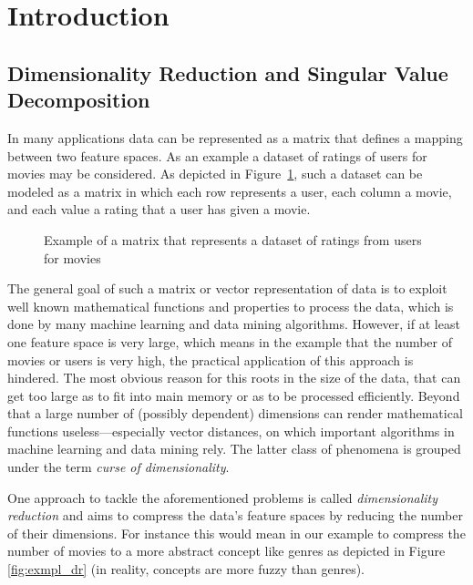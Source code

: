 \section{Introduction}

\subsection{Dimensionality Reduction and Singular Value Decomposition}

In many applications data can be represented as a matrix that defines a mapping between two feature spaces. As an example a dataset of ratings of users for movies may be considered. As depicted in Figure~\ref{fig:exmpl_matrix}, such a dataset can be modeled as a matrix in which each row represents a user, each column a movie, and each value a rating that a user has given a movie. 

\begin{figure}[h]
\centering
{}
\caption{Example of a matrix that represents a dataset of ratings from users for movies}
\label{fig:exmpl_matrix}
\end{figure}

The general goal of such a matrix or vector representation of data is to exploit well known mathematical functions and properties to process the data, which is done by many machine learning and data mining algorithms. However, if at least one feature space is very large, which means in the example that the number of movies or users is very high, the practical application of this approach is hindered. The most obvious reason for this roots in the size of the data, that can get too large as to fit into main memory or as to be processed efficiently. Beyond that a large number of (possibly dependent) dimensions can render mathematical functions useless---especially vector distances, on which important algorithms in machine learning and data mining rely. The latter class of phenomena is grouped under the term \textsl{curse of dimensionality}.

One approach to tackle the aforementioned problems is called \textsl{dimensionality reduction} and aims to compress the data's feature spaces by reducing the number of their dimensions. For instance this would mean in our example to compress the number of movies to a more abstract concept like genres as depicted in Figure \ref{fig:exmpl_dr} (in reality, concepts are more fuzzy than genres).

